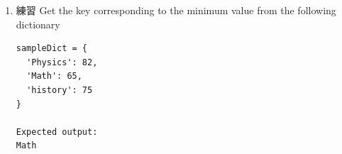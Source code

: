 \documentclass[a4paper,12pt]{article}
\begin{document}
\begin{enumerate}
\begin{enumerate}
\item fromkes
\label{sec:org381e6ef}
\begin{itemize}
\item <dict>.fromkeys(<seq>[, val]): Python 字典 fromkeys() 函數用於創建一個新字典，以序列 seq 中元素做字典的鍵，value 為字典所有鍵對應的初始值。\\
\end{itemize}
\lstset{breaklines=true,language=Python,label= ,caption= ,captionpos=b,firstnumber=1,numbers=left}
\begin{lstlisting}
name = ('Vanessa', 'May', 'John')
data = dict.fromkeys(name)
print(data)
data = dict.fromkeys(name, 100)
print(data)
\end{lstlisting}

\begin{verbatim}
{'Vanessa': None, 'May': None, 'John': None}
{'Vanessa': 100, 'May': 100, 'John': 100}
\end{verbatim}

\item 遍歷 Dict
\label{sec:org0cd907f}
\lstset{breaklines=true,language=Python,label= ,caption= ,captionpos=b,firstnumber=1,numbers=left}
\begin{lstlisting}
data = { 'John': 95,  'May': 100, 'Vanessa': 105, 'James': 999 }
for k, v in data.items():
    print(k, " : ", v)
\end{lstlisting}

\begin{verbatim}
John  :  95
May  :  100
Vanessa  :  105
James  :  999
\end{verbatim}
\end{enumerate}

\item 練習
\label{sec:org8c56f86}
Get the key corresponding to the minimum value from the following dictionary\\
\begin{verbatim}
sampleDict = {
  'Physics': 82,
  'Math': 65,
  'history': 75
}

Expected output:
Math
\end{verbatim}
\end{enumerate}
\end{document}
